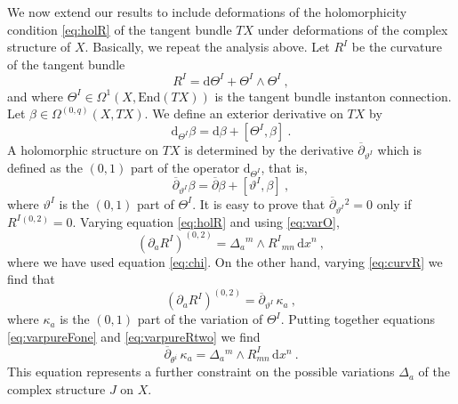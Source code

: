 \documentclass[12pt,a4paper]{article}
\def\bar#1{\overline{#1}}
\def\d{\textrm{d}}
\def\End{\textrm{End}}
\def\bp{\bar{\partial}}
\theoremstyle{definition}
\begin{document}
We now extend our results to include deformations of the holomorphicity condition \eqref{eq:holR} of the tangent bundle $TX$ under deformations of the complex structure of $X$.   Basically, we repeat the analysis above.  Let $R^I$ be the curvature of the tangent bundle 
\begin{equation}
R^I = \d \Theta^I + \Theta^I\wedge \Theta^I~,\label{eq:curvR}
\end{equation}
and where $\Theta^I\in\Omega^1(X,\End(TX))$ is the tangent bundle instanton connection.  Let $\beta\in\Omega^{(0,q)}(X, TX)$.   We define an exterior derivative on $TX$ by
\[ \d_{\Theta^I}\beta = \d\beta + [\Theta^I,\beta]~.\]
A holomorphic structure on $TX$ is determined by the derivative $\bar\partial_{\vartheta^I}$ which is defined as the $(0,1)$ part of the operator $\d_{\Theta^I}$, that is,
\begin{equation} \bar\partial_{\vartheta^I} \beta = \bp\beta + [{\vartheta^I},\beta]~,
\label{eq:bptheta}
\end{equation}
where $\vartheta^I$ is the $(0,1)$ part of $\Theta^I$.  It is easy to prove that $\bp_{\vartheta^I}{}^2 = 0$ only if $R^I{}^{(0,2)} = 0$.  
Varying equation \eqref{eq:holR} and using \eqref{eq:varO}, 
\begin{equation}
 (\partial_a R^I)^{(0,2)} = \Delta_a{}^m\wedge R^I{}_{mn}\, \d x^n~,\label{eq:varpureRone}
 \end{equation}
where we have used equation \eqref{eq:chi}.
On the other hand, varying \eqref{eq:curvR} we find that
\begin{equation}
 (\partial_a R^I)^{(0,2)} = \bar\partial_{\vartheta^I}\,\kappa_a~,\label{eq:varpureRtwo}
 \end{equation}
 where $\kappa_a$ is the $(0,1)$ part of the variation of $\Theta^I$.   Putting together equations \eqref{eq:varpureFone} and \eqref{eq:varpureRtwo} we find
 \begin{equation}
 \bar\partial_{\theta^i}\,\kappa_a = \Delta_a{}^m\wedge R^I_{mn}\, \d x^n~.\label{eq:atiyahR}
 \end{equation}
 This equation represents a further constraint on the possible variations $\Delta_a$ of the complex structure $J$ on $X$.
  
\end{document}
